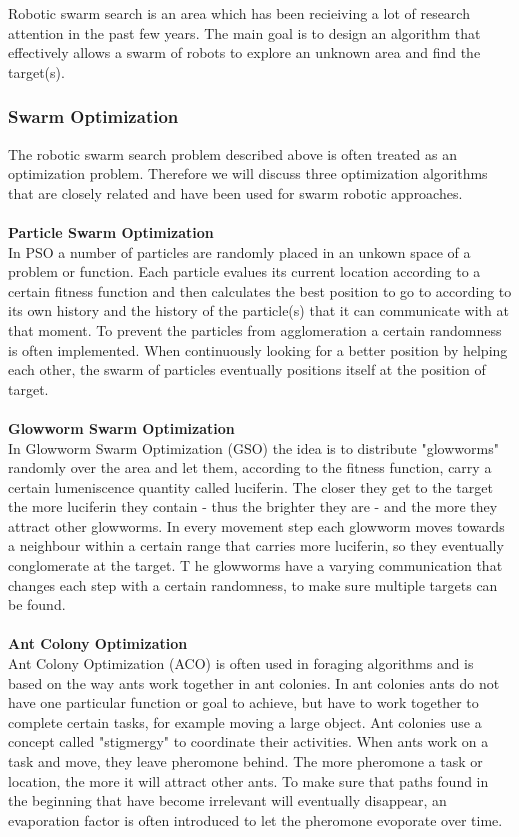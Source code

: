 
Robotic swarm search is an area which has been recieiving a lot of research attention in the past few years. 
The main goal is to design an algorithm that effectively allows a swarm of robots to explore an unknown area and find the target(s).

\subsubsection{Swarm Optimization}
The robotic swarm search problem described above is often treated as an optimization problem. Therefore we will discuss three optimization algorithms that are closely related and have been used for swarm robotic approaches.\\
	\\
	\textbf{Particle Swarm Optimization}\\
	In PSO a number of particles are randomly placed in an unkown space of a problem or function. 
	Each particle evalues its current location according to a certain fitness function and then calculates the best position to go to according to its own history and the history of the particle(s) that it can communicate with at that moment. 
	To prevent the particles from agglomeration a certain randomness is often implemented. 
	When continuously looking for a better position by helping each other, the swarm of particles eventually positions itself at the position of target. \cite{poli2007particle}\\
	\\	
	\textbf{Glowworm Swarm Optimization}\\
	In Glowworm Swarm Optimization (GSO) the idea is to distribute "glowworms" randomly over the area and let them, according to the fitness function, carry a certain lumeniscence quantity called luciferin. 
	The closer they get to the target the more luciferin they contain - thus the brighter they are - and the more they attract other glowworms. 
	In every movement step each glowworm moves towards a neighbour within a certain range that carries more luciferin, so they eventually conglomerate at the target. T
	he glowworms have a varying communication that changes each step with a certain randomness, to make sure multiple targets can be found. \cite{krishnanand2006glowworm}\\
	\\
	\textbf{Ant Colony Optimization}\\
	Ant Colony Optimization (ACO) is often used in foraging algorithms and is based on the way ants work together in ant colonies. In ant colonies ants do not have one particular function or goal to achieve, but have to work together to complete certain tasks, for example moving a large object.
	Ant colonies use a concept called "stigmergy" to coordinate their activities. 
	When ants work on a task and move, they leave pheromone behind. 
	The more pheromone a task or location, the more it will attract other ants.
	To make sure that paths found in the beginning that have become irrelevant will eventually disappear, an evaporation factor is often introduced to let the pheromone evoporate over time. \cite{yingying2003multi}

